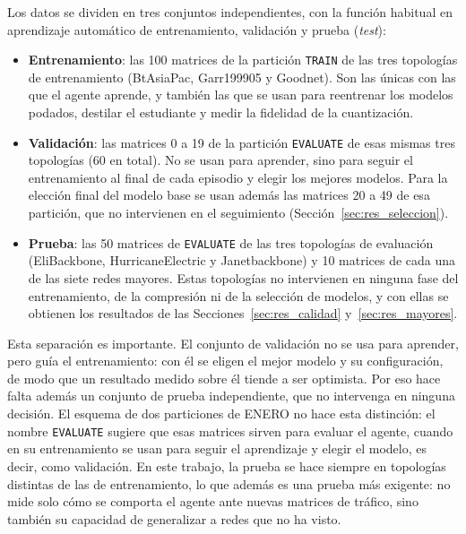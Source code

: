 Los datos se dividen en tres conjuntos independientes, con la función habitual en aprendizaje automático de entrenamiento, validación y prueba (\textit{test}):

\begin{itemize}
	\item \textbf{Entrenamiento}: las 100 matrices de la partición \texttt{TRAIN} de las tres topologías de entrenamiento (BtAsiaPac, Garr199905 y Goodnet). Son las únicas con las que el agente aprende, y también las que se usan para reentrenar los modelos podados, destilar el estudiante y medir la fidelidad de la cuantización.
	\item \textbf{Validación}: las matrices 0 a 19 de la partición \texttt{EVALUATE} de esas mismas tres topologías (60 en total). No se usan para aprender, sino para seguir el entrenamiento al final de cada episodio y elegir los mejores modelos. Para la elección final del modelo base se usan además las matrices 20 a 49 de esa partición, que no intervienen en el seguimiento (Sección~\ref{sec:res_seleccion}).
	\item \textbf{Prueba}: las 50 matrices de \texttt{EVALUATE} de las tres topologías de evaluación (EliBackbone, HurricaneElectric y Janetbackbone) y 10 matrices de cada una de las siete redes mayores. Estas topologías no intervienen en ninguna fase del entrenamiento, de la compresión ni de la selección de modelos, y con ellas se obtienen los resultados de las Secciones~\ref{sec:res_calidad} y~\ref{sec:res_mayores}.
\end{itemize}

Esta separación es importante. El conjunto de validación no se usa para aprender, pero guía el entrenamiento: con él se eligen el mejor modelo y su configuración, de modo que un resultado medido sobre él tiende a ser optimista. Por eso hace falta además un conjunto de prueba independiente, que no intervenga en ninguna decisión. El esquema de dos particiones de ENERO no hace esta distinción: el nombre \texttt{EVALUATE} sugiere que esas matrices sirven para evaluar el agente, cuando en su entrenamiento se usan para seguir el aprendizaje y elegir el modelo, es decir, como validación. En este trabajo, la prueba se hace siempre en topologías distintas de las de entrenamiento, lo que además es una prueba más exigente: no mide solo cómo se comporta el agente ante nuevas matrices de tráfico, sino también su capacidad de generalizar a redes que no ha visto.

